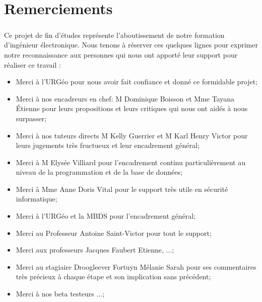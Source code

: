 \chapter*{Remerciements}
\paragraph{}
Ce projet de fin d’études représente l'aboutissement de notre formation d’ingénieur électronique. 
Nous tenons à réserver ces quelques lignes pour exprimer notre
reconnaissance aux personnes qui nous ont apporté leur support pour réaliser ce travail :

\begin{itemize}
    \item Merci à l'URGéo pour nous avoir fait confiance et donné ce formidable projet;\par
    \item Merci à nos encadreurs en chef: M Dominique Boisson et Mme Tayana Étienne pour 
    leurs propositions et leurs critiques qui nous ont aidés à nous surpasser; \par
    \item Merci à nos tuteurs directs M Kelly Guerrier et M Karl Henry Victor pour leurs 
    jugements très fructueux et leur encadrement général;\par
    \item Merci à  M Elysée Villiard pour l'encadrement continu particulièrement
    au niveau de la programmation et de la base de données;\par
    \item Merci à Mme Anne Doris Vital pour le support très utile en sécurité informatique;\par
    \item Merci à l'URGéo et la MBDS pour l'encadrement général;\par
    \item Merci au Professeur Antoine Saint-Victor pour tout le support;\par
    \item Merci aux professeurs Jacques Faubert Etienne, ...;\par
    \item Merci au stagiaire Droogleever Fortuyn Mélanie Sarah pour ses commentaires 
    très précieux à chaque étape et son implication sans précédent; \par
    \item Merci à nos beta testeurs ...;\par

\end{itemize}
